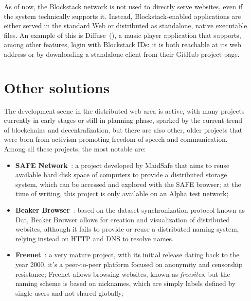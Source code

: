 \documentclass[mscthesis]{usiinfthesis}
\begin{document}
As of now, the Blockstack network is not used to directly serve websites, even if the system technically supports it. Instead, Blockstack-enabled applications are either served in the standard Web or distributed as standalone, native executable files.
An example of this is Diffuse~(\cite{website:diffuse}), a music player application that supports, among other features, login with Blockstack IDs: it is both reachable at its web address or by downloading a standalone client from their GitHub project page.

\section{Other solutions}\label{sec:browserprojects}

The development scene in the distributed web area is active, with many projects currently in early stages or still in planning phase, sparked by the current trend of blockchains and decentralization, but there are also other, older projects that were born from activism promoting freedom of speech and communication. Among all these projects, the most notable are:

\begin{itemize}
\item \textbf{SAFE Network}~\cite{}: a project developed by MaidSafe that aims to reuse available hard disk space of computers to provide a distributed storage system, which can be accessed and explored with the SAFE browser; at the time of writing, this project is only available on an Alpha test network;
	\item \textbf{Beaker Browser}~\cite{}: based on the dataset synchronization protocol known as Dat, Beaker Browser allows for creation and visualization of distributed websites, although it fails to provide or reuse a distributed naming system, relying instead on HTTP and DNS to resolve names.
	\item \textbf{Freenet}~\cite{}: a very mature project, with its initial release dating back to the year 2000, it's a peer-to-peer platform focused on anonymity and censorship resistance; Freenet allows browsing websites, known as \emph{freesites}, but the naming scheme is based on nicknames, which are simply labels defined by single users and not shared globally;
\end{itemize}
\end{document}
